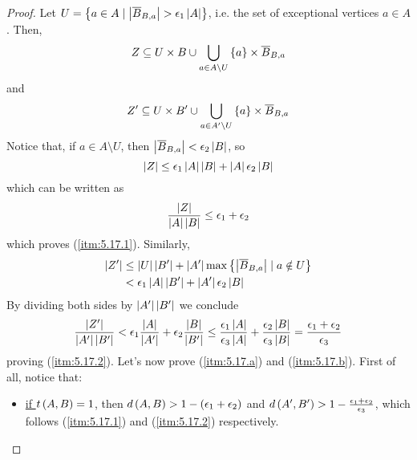         \begin{proof}
            Let $U = \left\{ a \in A \mid \left| \overline{B}_{B,a} \right| > \epsilon_1 \left| A \right| \right\}$, i.e. the set
            of exceptional vertices $a \in A$.
            Then,
            \[
                Z \subseteq U \times B \cup \bigcup_{a \in A \setminus U} \left\{ a \right\} \times \overline{B}_{B,a}
            \]
            and
            \[
                Z' \subseteq U \times B' \cup \bigcup_{a \in A' \setminus U} \left\{ a \right\} \times \overline{B}_{B,a}
            \]
            Notice that, if $a \in A \setminus U$, then $\left| \overline{B}_{B,a} \right| < \epsilon_2 \left| B \right|$, so
            \[
                \left| Z \right| \leq \epsilon_1 \left| A \right| \left| B \right| + \left| A \right| \epsilon_2 \left| B \right|
            \]
            which can be written as
            \[
                    \frac{\left| Z \right|}{\left| A \right| \left| B \right|} \leq \epsilon_1 + \epsilon_2
            \]
            which proves (\ref{itm:5.17.1}).
            Similarly,
            \begin{align*}
                \left| Z' \right| & \leq \left| U \right| \left| B' \right| + \left| A' \right| \max \left\{ \left| \overline{B}_{B,a} \right| \mid a \notin U \right\} \\
                                 & < \epsilon_1 \left| A \right| \left| B' \right| + \left| A' \right| \epsilon_2 \left| B \right|
            \end{align*}
            By dividing both sides by $\left| A' \right| \left| B' \right|$ we conclude
            \[
                {\left| Z' \right| \over \left| A' \right| \left| B' \right|} < \epsilon_1 \frac{\left| A \right|}{\left| A' \right|} + \epsilon_2 \frac{\left| B \right|}{\left| B' \right|}
                \leq {{\epsilon_1 \left| A \right|} \over {\epsilon_3 \left| A \right|}} + {{\epsilon_2 \left| B \right|} \over {\epsilon_3 \left| B \right|}}
                = {{\epsilon_1 + \epsilon_2} \over \epsilon_3}
            \]
            proving (\ref{itm:5.17.2}).
            Let's now prove (\ref{itm:5.17.a}) and (\ref{itm:5.17.b}).
            First of all, notice that:
            \begin{itemize}
                \item \underline{if $t\left( A,B \right) = 1$}, then $d\left( A,B \right) > 1 - \left( \epsilon_1 + \epsilon_2 \right)$
                    and $d \left( A',B' \right) > 1 - {{\epsilon_1 + \epsilon_2} \over \epsilon_3}$, which follows (\ref{itm:5.17.1}) and
                    (\ref{itm:5.17.2}) respectively.

\end{itemize}
\end{proof}
